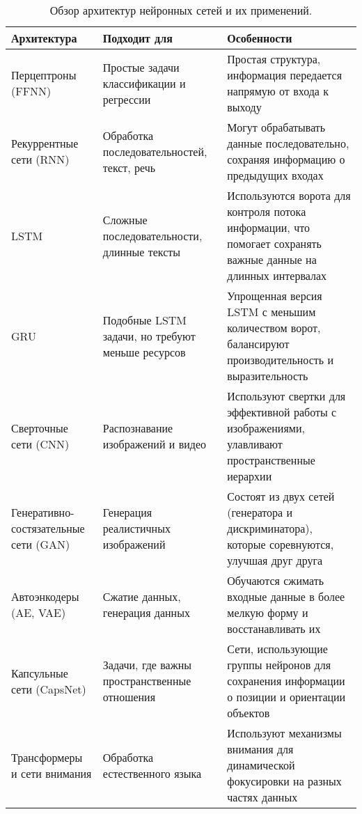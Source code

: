 \begin{table}[h]
	\centering
	{\scriptsize
		\renewcommand{\arraystretch}{1.5}
		\begin{tabular}{|>{\raggedright\arraybackslash}p{3.2cm}|>{\raggedright\arraybackslash}p{3.5cm}|>{\raggedright\arraybackslash}p{6cm}|}
			\hline
			\textbf{Архитектура} & \textbf{Подходит для} & \textbf{Особенности} \\
			\hline
			Перцептроны (FFNN) & Простые задачи классификации и регрессии & Простая структура, информация передается напрямую от входа к выходу \\
			\hline
			Рекуррентные сети (RNN) & Обработка последовательностей, текст, речь & Могут обрабатывать данные последовательно, сохраняя информацию о предыдущих входах \\
			\hline
			LSTM & Сложные последовательности, длинные тексты & Используются ворота для контроля потока информации, что помогает сохранять важные данные на длинных интервалах \\
			\hline
			GRU & Подобные LSTM задачи, но требуют меньше ресурсов & Упрощенная версия LSTM с меньшим количеством ворот, балансируют производительность и выразительность \\
			\hline
			Сверточные сети (CNN) & Распознавание изображений и видео & Используют свертки для эффективной работы с изображениями, улавливают пространственные иерархии \\
			\hline
			Генеративно-
			состязательные сети (GAN) & Генерация реалистичных изображений & Состоят из двух сетей (генератора и дискриминатора), которые соревнуются, улучшая друг друга \\
			\hline
			Автоэнкодеры (AE, VAE) & Сжатие данных, генерация данных & Обучаются сжимать входные данные в более мелкую форму и восстанавливать их \\
			\hline
			Капсульные сети (CapsNet) & Задачи, где важны пространственные отношения & Сети, использующие группы нейронов для сохранения информации о позиции и ориентации объектов \\
			\hline
			Трансформеры и сети внимания & Обработка естественного языка & Используют механизмы внимания для динамической фокусировки на разных частях данных \\
			\hline
		\end{tabular}
	}
	\caption{Обзор архитектур нейронных сетей и их применений.}
	\label{tab:ArchitecturesTable}
\end{table}